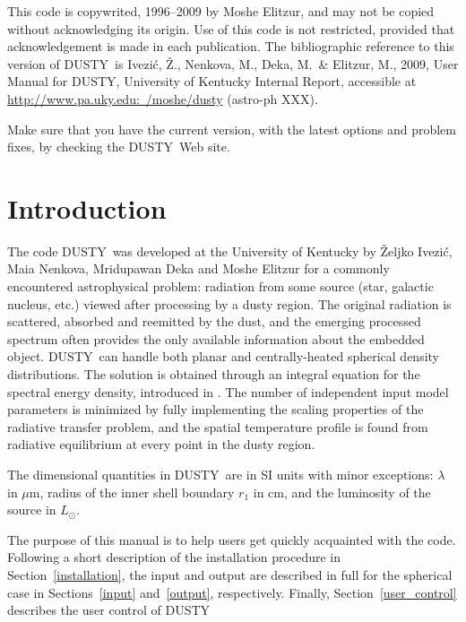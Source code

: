 \documentclass[11pt]{article}
\def\D  {{\sf DUSTY}}
\def\mic    {\hbox{$\mu$m}}
\def\Ivezic {Ivezi\'c}
\begin{document}
\newpage

\thispagestyle{empty}

This code is copywrited, 1996--2009 by Moshe Elitzur, and may not be copied
without acknowledging its origin. Use of this code is not restricted, provided
that acknowledgement is made in each publication.  The bibliographic reference
to this version of \D\ is \Ivezic, \v Z., Nenkova, M., Deka, M.\ \& Elitzur,
M., 2009, User Manual for \D, University of Kentucky Internal Report,
accessible at \href{http://www.pa.uky.edu:~/moshe/dusty}
{http://www.pa.uky.edu:~/moshe/dusty} (astro-ph XXX).

Make sure that you have the current version, with the latest options and
problem fixes, by checking the \D\ Web site.

\newpage

\setcounter{page}{1}

{\large\tableofcontents}


\section{Introduction}
\label{Introduction}

The code \D\ was developed at the University of Kentucky by \v Zeljko \Ivezic,
Maia Nenkova, Mridupawan Deka and Moshe Elitzur for a commonly encountered astrophysical
problem: radiation from some source (star, galactic nucleus, etc.) viewed after
processing by a dusty region. The original radiation is scattered, absorbed and
reemitted by the dust, and the emerging processed spectrum often provides the
only available information about the embedded object. \D\ can handle both
planar and centrally-heated spherical density distributions.  The solution is
obtained through an integral equation for the spectral energy density,
introduced in \cite{IE97}. The number of independent input model parameters is
minimized by fully implementing the scaling properties of the radiative
transfer problem, and the spatial temperature profile is found from radiative
equilibrium at every point in the dusty region. 

The dimensional quantities in \D\ are in SI units with minor exceptions: $\lambda$ in \mic, 
radius of the inner shell boundary $r_1$ in cm, and the luminosity of the source in $L_\odot$. 

The purpose of this manual is to help users get quickly acquainted with the
code. Following a short description of the installation procedure in 
Section~\ref{installation},  the input and output are described in full for 
the spherical case in Sections~\ref{input} and~\ref{output}, respectively. Finally, 
Section~\ref{user_control} describes the user control of \D
\end{document}
